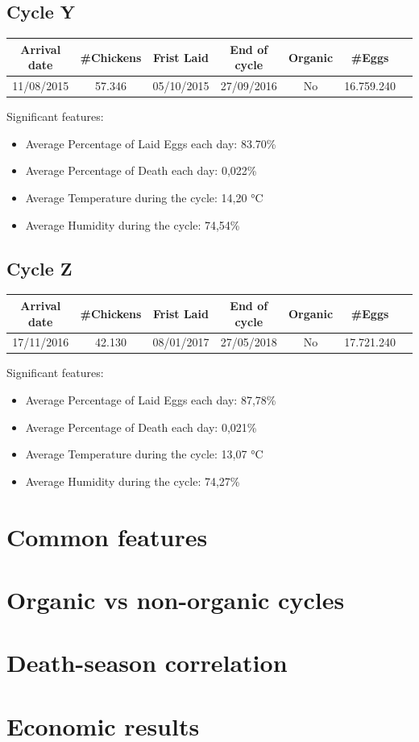 \documentclass[11pt]{article}
\begin{document}
\subsection{Cycle Y}
\begin{center}
    \begin{tabular}{| c | c | c | c | c | c | c |} 
        \hline
        Arrival date & \#Chickens & Frist Laid & End of cycle & Organic & \#Eggs\\ [0.5ex] 
        \hline
        11/08/2015 & 57.346 & 05/10/2015 & 27/09/2016 & No & 16.759.240\\ 
        \hline
    \end{tabular}
\end{center}

Significant features:
\begin{itemize}
    \item Average Percentage of Laid Eggs each day: 83.70\%
    \item Average Percentage of Death each day: 0,022\%
    \item Average Temperature during the cycle: 14,20 °C
    \item Average Humidity during the cycle: 74,54\%
\end{itemize}

\subsection{Cycle Z}
\begin{center}
    \begin{tabular}{| c | c | c | c | c | c | c |} 
        \hline
        Arrival date & \#Chickens & Frist Laid & End of cycle & Organic & \#Eggs\\ [0.5ex] 
        \hline
        17/11/2016 & 42.130 & 08/01/2017 & 27/05/2018 & No & 17.721.240\\ 
        \hline
    \end{tabular}
\end{center}

Significant features:
\begin{itemize}
    \item Average Percentage of Laid Eggs each day: 87,78\%
    \item Average Percentage of Death each day: 0,021\%
    \item Average Temperature during the cycle: 13,07 °C
    \item Average Humidity during the cycle: 74,27\%
\end{itemize}

\section{Common features}

\section{Organic vs non-organic cycles}

\section{Death-season correlation}

\section{Economic results}
\end{document}

